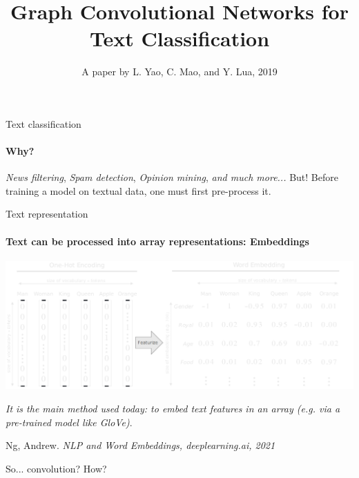 \documentclass{beamer}
\title{Graph Convolutional Networks for Text Classification}
\subtitle{A paper by L. Yao, C. Mao, and Y. Lua, 2019}
\begin{document}
  \frame[c]{\maketitle}

  \begin{darkframes}

    \begin{frame}[label=lists]{Text classification}
        \framesubtitle{Why?}
        \textit{News filtering},\clearpage
        \textit{Spam detection},\clearpage
        \textit{Opinion mining},\clearpage
        \textit{and much more...}\clearpage
        But!\clearpage
        Before training a model on textual data, one must first pre-process it.
    \end{frame}

    \begin{frame}[label=lists]{Text representation}
        \framesubtitle{Text can be processed into array representations: Embeddings}
        \centering\includegraphics[width=\textwidth]{fibeamer/logo/zut/embeds.png}
        \clearpage
        \raggedright\textit{It is the main method used today: to embed text features in an array (e.g. via a pre-trained model like GloVe)}.
        \clearpage
        \raggedright\tiny{Ng, Andrew. \emph{NLP and Word Embeddings, deeplearning.ai, 2021}}
    \end{frame}

    \begin{frame}[label=lists]{}
        \large{So... convolution? How?}
    \end{frame}
    

\end{darkframes}
\end{document}
